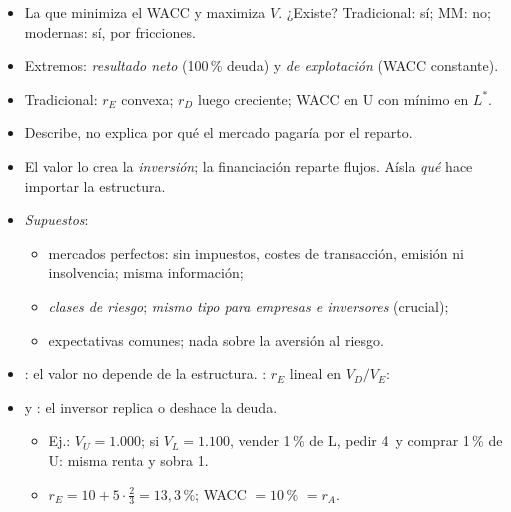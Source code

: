 \documentclass{article}
\begin{document}
\begin{columnas}
\begin{itemize}
\item La que minimiza el WACC y maximiza $V$. ¿Existe? Tradicional: sí; MM: no; modernas: sí, por fricciones.
\end{itemize}
\begin{itemize}
\item Extremos: \emph{resultado neto} (100\,\% deuda) y \emph{de explotación} (WACC constante).
\item Tradicional: $r_E$ convexa; $r_D$ luego creciente; WACC en U con mínimo en $L^*$.
\item Describe, no explica por qué el mercado pagaría por el reparto.
\end{itemize}
\begin{itemize}
\item El valor lo crea la \emph{inversión}; la financiación reparte flujos. Aísla \emph{qué} hace importar la estructura.
\item \emph{Supuestos}:
  \begin{itemize}
  \item mercados perfectos: sin impuestos, costes de transacción, emisión ni insolvencia; misma información;
  \item \emph{clases de riesgo}; \emph{mismo tipo para empresas e inversores} (crucial);
  \item expectativas comunes; nada sobre la aversión al riesgo.
  \end{itemize}
\end{itemize}
\begin{itemize}
\item {}: el valor no depende de la estructura. : $r_E$ lineal en $V_D/V_E$:
\item {} y : el inversor replica o deshace la deuda.
  \begin{itemize}
  \item Ej.: $V_U=1.000$; si $V_L=1.100$, vender 1\,\% de L, pedir 4~y comprar 1\,\% de U: misma renta y sobra 1.
  \item $r_E=10+5\cdot\tfrac23=13{,}3$\,\%; WACC $=10$\,\% $=r_A$.

\end{itemize}
\end{itemize}
\end{columnas}
\end{document}
